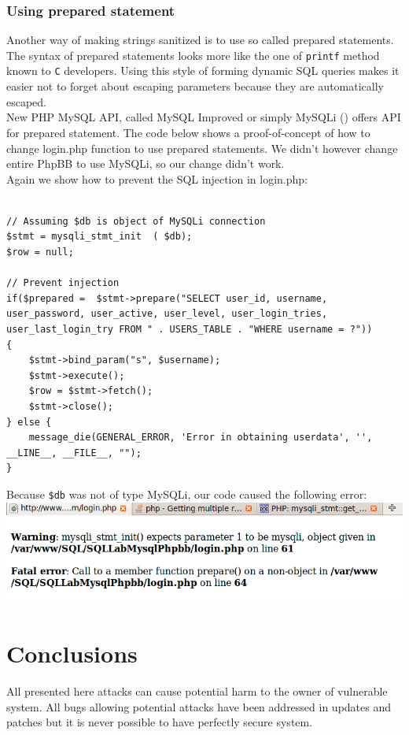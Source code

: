 \documentclass[12pt, a4paper]{article}
\begin{document}
\subsubsection{Using prepared statement}
Another way of making strings sanitized is to use so called prepared statements. The syntax of prepared statements looks more like the one of \texttt{printf} method known to \texttt{C} developers. Using this style of forming dynamic SQL queries makes it easier not to forget about escaping parameters because they are automatically escaped.\\

New PHP MySQL API, called MySQL Improved or simply MySQLi (\cite{mysqli}) offers API for prepared statement. The code below shows a proof-of-concept of how to change login.php function to use prepared statements. We didn't however change entire PhpBB to use MySQLi, so our change didn't work.\\

Again we show how to prevent the SQL injection in login.php:
\lstset{
	captionpos=b,
	frame=single,
	language=PHP,
	breaklines=true,
	label=sqladdslash4
}
\begin{lstlisting}	

// Assuming $db is object of MySQLi connection
$stmt = mysqli_stmt_init  ( $db);
$row = null;

// Prevent injection
if($prepared =  $stmt->prepare("SELECT user_id, username, user_password, user_active, user_level, user_login_tries, user_last_login_try FROM " . USERS_TABLE . "WHERE username = ?"))
{
	$stmt->bind_param("s", $username);
	$stmt->execute();
	$row = $stmt->fetch();
	$stmt->close();
} else {
	message_die(GENERAL_ERROR, 'Error in obtaining userdata', '', __LINE__, __FILE__, "");
}
\end{lstlisting}

Because \texttt{\$db} was not of type MySQLi, our code caused the following error:\\
\includegraphics[width=.95\textwidth]{gfx/sql/mysqli.png}

\section{Conclusions}
All presented here attacks can cause potential harm to the owner of vulnerable system. All bugs allowing potential attacks have been addressed in updates and patches but it is never possible to have perfectly secure system.\\
\end{document}
